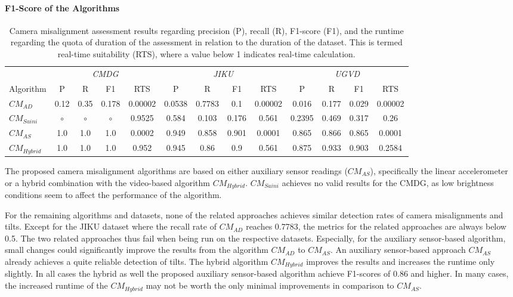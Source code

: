 \paragraph{F1-Score of the Algorithms}
\begin{table}[htb]
	\centering
	\begin{tabular}{lcccccccccccc}
		\toprule
		& \multicolumn{4}{c}{\textit{CMDG}} & \multicolumn{4}{c}{\textit{JIKU}} & \multicolumn{4}{c}{\textit{UGVD}}  \\
		\cmidrule(lr){2-5}
		\cmidrule(lr){6-9}
		\cmidrule(lr){10-13}
		Algorithm & P & R & F1 & RTS & P & R & F1 & RTS & P & R & F1 & RTS  \\
		\midrule
		$CM_{AD}$ & 0.12 & 0.35 & 0.178 & 0.00002 & 0.0538& 0.7783& 0.1 & 0.00002 &0.016 & 0.177& 0.029 &0.00002 \\
		$CM_{Saini}$ & $\circ$ & $\circ$ & $\circ$ & 0.9525 &0.584 & 0.103 & 0.176 & 0.561& 0.2395& 0.469 & 0.317 & 0.26\\
		\midrule
		$CM_{AS}$ & 1.0 & 1.0 & 1.0 & 0.0002 & 0.949 & 0.858 &0.901 & 0.0001 & 0.865 & 0.866 & 0.865 & 0.0001\\
		$CM_{Hybrid}$ & 1.0 & 1.0 & 1.0 & 0.952 & 0.945 & 0.86 & 0.9 & 0.561& 0.875 & 0.933 & 0.903 & 0.2584 \\
		\bottomrule
	\end{tabular}
	\caption[Evaluation results for camera misalignment algorithms.]{Camera misalignment assessment results regarding precision (P), recall (R), F1-score (F1), and the runtime regarding the quota of duration of the assessment in relation to the duration of the dataset. This is termed real-time suitability (RTS), where a value below 1 indicates real-time calculation.}
	\label{tab:556_eval_camera_misalignment_table}
\end{table}
The proposed camera misalignment algorithms are based on either auxiliary sensor readings ($CM_{AS}$), specifically the linear accelerometer or a hybrid combination with the video-based algorithm $CM_{Hybrid}$.
$CM_{Saini}$ achieves no valid results for the CMDG, as low brightness conditions seem to affect the performance of the algorithm.

For the remaining algorithms and datasets, none of the related approaches achieves similar detection rates of camera misalignments and tilts.
Except for the JIKU dataset where the recall rate of $CM_{AD}$ reaches 0.7783, the metrics for the related approaches are always below 0.5.
The two related approaches thus fail when being run on the respective datasets. 
Especially, for the auxiliary sensor-based algorithm, small changes could significantly improve the results from the algorithm $CM_{AD}$ to $CM_{AS}$.
An auxiliary sensor-based approach $CM_{AS}$ already achieves a quite reliable detection of tilts.
The hybrid algorithm $CM_{Hybrid}$ improves the results and increases the runtime only slightly.
In all cases the hybrid as well the proposed auxiliary sensor-based algorithm achieve F1-scores of 0.86 and higher.
In many cases, the increased runtime of the $CM_{Hybrid}$ may not be worth the only minimal improvements in comparison to $CM_{AS}$.
